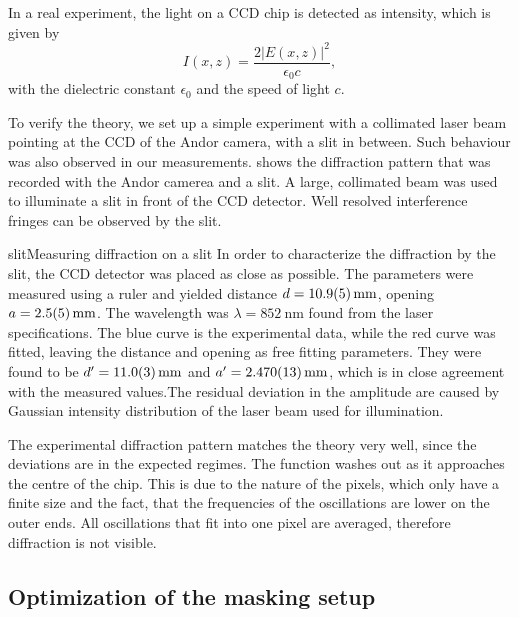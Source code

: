 In a real experiment, the light on a CCD chip is detected as intensity, which is given by
\begin{equation}
I(x,z) = \frac{2 \lvert E(x,z) \rvert ^2}{\epsilon_0 c} ,
\end{equation}
with the dielectric constant $\epsilon_0$ and the speed of light $c$.

To verify the theory, we set up a simple experiment with a collimated laser beam pointing at the CCD of the Andor camera, with a slit in between. Such behaviour was also observed in our measurements.  shows the diffraction pattern that was recorded with the Andor camerea and a slit. A large, collimated beam was used to illuminate a slit in front of the CCD detector. Well resolved interference fringes can be observed by the slit.

\pltCustom{
	\begin{center}
		
		
	\end{center}
}
{slit}{Measuring diffraction on a slit}{
	In order to characterize the diffraction by the slit, the CCD detector was placed as close as possible. The parameters were measured using a ruler and yielded distance $d=\SI{10.9\pm0.5}{\milli\meter}$, opening $a=\SI{2.5\pm0.5}{\milli\meter}$. The wavelength was $\lambda =\SI{852}{\nano\meter}$ found from the laser specifications. The blue curve is the experimental data, while the red curve was fitted, leaving the distance and opening as free fitting parameters. They were found to be $d^\prime=\SI{11.0\pm0.3}{\milli\meter}$ and $a^\prime=\SI{2.470\pm0.013}{\milli\meter}$, which is in close agreement with the measured values.The residual deviation in the amplitude are caused by Gaussian intensity distribution of the laser beam used for illumination.
}

The experimental diffraction pattern matches the theory very well, since the deviations are in the expected regimes.
The function washes out as it approaches the centre of the chip. This is due to the nature of the pixels, which only have a finite size and the fact, that the frequencies of the oscillations are lower on the outer ends. All oscillations that fit into one pixel are averaged, therefore diffraction is not visible.

\newpage
\subsection{Optimization of the masking setup}
\label{subsec:slit_optim}

